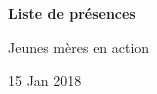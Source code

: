 \documentclass{article}%
\begin{document}
%
\normalsize%
\pagestyle{header}%
\begin{minipage}{\textwidth}%
\centering%
\begin{Large}%
\textbf{Liste de présences}%
\end{Large}%
\linebreak%
\begin{large}%
Jeunes mères en action%
\end{large}%
\linebreak%
\begin{large}%
15 Jan 2018%
\end{large}%
\end{minipage}%
\end{document}
